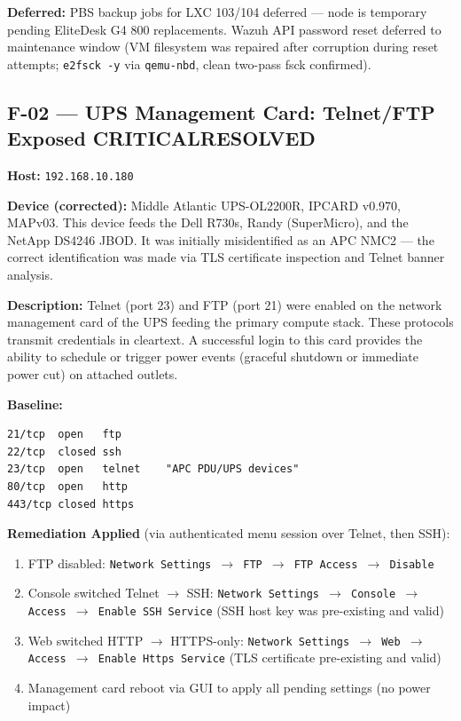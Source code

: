 \documentclass[11pt,a4paper]{article}
\newcommand{\critical}{\colorbox{critical}{\color{white}\small\textbf{CRITICAL}}}
\newcommand{\resolved}{\colorbox{resolved}{\color{white}\small\textbf{RESOLVED}}}
\begin{document}
\textbf{Deferred:} PBS backup jobs for LXC 103/104 deferred — node is temporary pending
EliteDesk G4 800 replacements. Wazuh API password reset deferred to maintenance window
(VM filesystem was repaired after corruption during reset attempts; \texttt{e2fsck -y} via
\texttt{qemu-nbd}, clean two-pass fsck confirmed).

\subsection{F-02 — UPS Management Card: Telnet/FTP Exposed \quad \critical \quad \resolved}

\textbf{Host:} \texttt{192.168.10.180}

\textbf{Device (corrected):} Middle Atlantic UPS-OL2200R, IPCARD v0.970, MAPv03. This device
feeds the Dell R730s, Randy (SuperMicro), and the NetApp DS4246 JBOD. It was initially
misidentified as an APC NMC2 — the correct identification was made via TLS certificate
inspection and Telnet banner analysis.

\textbf{Description:} Telnet (port 23) and FTP (port 21) were enabled on the network
management card of the UPS feeding the primary compute stack. These protocols transmit
credentials in cleartext. A successful login to this card provides the ability to schedule
or trigger power events (graceful shutdown or immediate power cut) on attached outlets.

\textbf{Baseline:}
\begin{lstlisting}
21/tcp  open   ftp
22/tcp  closed ssh
23/tcp  open   telnet    "APC PDU/UPS devices"
80/tcp  open   http
443/tcp closed https
\end{lstlisting}

\textbf{Remediation Applied} (via authenticated menu session over Telnet, then SSH):
\begin{enumerate}[nosep]
  \item FTP disabled: \texttt{Network Settings $\to$ FTP $\to$ FTP Access $\to$ Disable}
  \item Console switched Telnet $\to$ SSH: \texttt{Network Settings $\to$ Console $\to$ Access $\to$ Enable SSH Service} (SSH host key was pre-existing and valid)
  \item Web switched HTTP $\to$ HTTPS-only: \texttt{Network Settings $\to$ Web $\to$ Access $\to$ Enable Https Service} (TLS certificate pre-existing and valid)
  \item Management card reboot via GUI to apply all pending settings (no power impact)
\end{enumerate}
\end{document}
